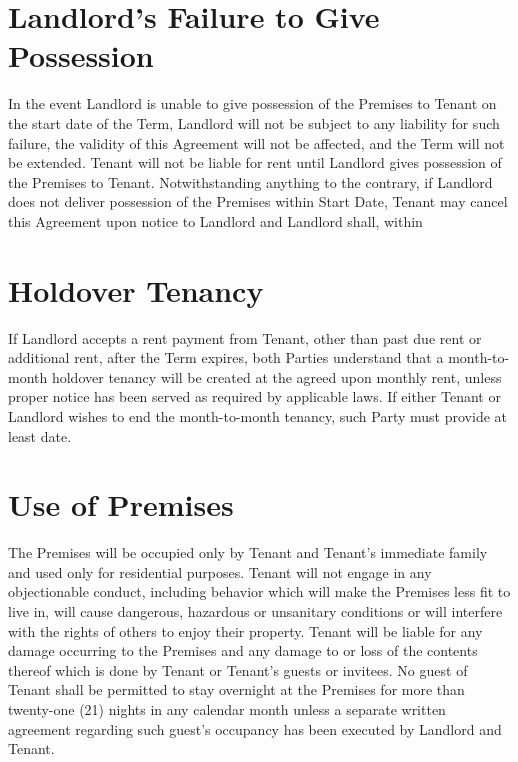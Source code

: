 \documentclass[12pt]{article}
\begin{document}
{\section{Landlord's Failure to Give Possession}
In the event Landlord is unable to give possession of the Premises to Tenant on the start date
of the Term, Landlord will not be subject to any liability for such failure, the validity of this
Agreement will not be affected, and the Term will not be extended. Tenant will not be liable for
rent until Landlord gives possession of the Premises to Tenant. Notwithstanding anything to
the contrary, if Landlord does not deliver possession of the Premises within %
Start Date, Tenant may cancel this Agreement upon notice to Landlord and Landlord shall,
within %

\section{Holdover Tenancy}
If Landlord accepts a rent payment from Tenant, other than past due rent or additional rent,
after the Term expires, both Parties understand that a month-to-month holdover tenancy will be
created at the agreed upon monthly rent, unless proper notice has been served as required by
applicable laws. If either Tenant or Landlord wishes to end the month-to-month tenancy, such
Party must provide at least %
date.

\section{Use of Premises}
The Premises will be occupied only by Tenant and Tenant's immediate family and used only for
residential purposes. Tenant will not engage in any objectionable conduct, including behavior
which will make the Premises less fit to live in, will cause dangerous, hazardous or unsanitary
conditions or will interfere with the rights of others to enjoy their property. Tenant will be
liable for any damage occurring to the Premises and any damage to or loss of the contents
thereof which is done by Tenant or Tenant's guests or invitees. No guest of Tenant shall be
permitted to stay overnight at the Premises for more than twenty-one (21) nights in any
calendar month unless a separate written agreement regarding such guest's occupancy has been
executed by Landlord and Tenant.

}
\end{document}
